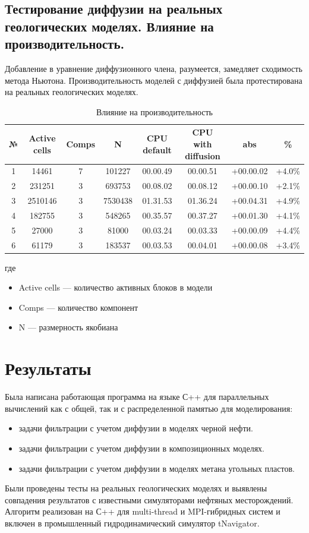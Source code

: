 \documentclass[12pt,a4paper]{article}
\begin{document}
{\subsection {Тестирование диффузии на реальных геологических моделях. Влияние на производительность.}
Добавление в уравнение диффузионного члена, разумеется, замедляет сходимость метода Ньютона. Производительность моделей с диффузией была протестирована на реальных геологических моделях.

\begin{table}[!h]
\caption{Влияние на производительность}
\begin{center}
\begin{tabular}{|c|c|c|c|c|c|c|c|}
\hline
№ & Active cells & Comps & N & CPU default & CPU with diffusion & abs & \% \\
\hline
1 & 14461 & 7 & 101227 & 00.00.49 & 00.00.51 & +00.00.02 & +4.0\% \\
\hline
2 & 231251 & 3 & 693753 & 00.08.02 & 00.08.12 & +00.00.10 & +2.1\% \\
\hline
3 & 2510146 & 3 & 7530438 & 01.31.53 & 01.36.24 & +00.04.31 & +4.9\% \\
\hline
4 & 182755 & 3 & 548265 & 00.35.57 & 00.37.27 & +00.01.30 & +4.1\% \\
\hline
5 & 27000 & 3 & 81000 & 00.03.24 & 00.03.33 & +00.00.09 & +4.4\% \\
\hline
6 & 61179 & 3 & 183537 & 00.03.53 & 00.04.01 & +00.00.08 & +3.4\% \\
\hline
\end{tabular}
\end{center}
\end{table}
где
\begin{itemize}
\item Active cells --- количество активных блоков в модели
\item Comps --- количество компонент
\item N --- размерность якобиана
\end{itemize}

\section{Результаты}
Была написана работающая программа на языке С++ для параллельных вычислений как с общей, так и с распределенной памятью для моделирования:
\begin{itemize}
\item задачи фильтрации с учетом диффузии в моделях черной нефти. 
\item задачи фильтрации с учетом диффузии в композиционных моделях.
\item задачи фильтрации с учетом диффузии в моделях метана угольных пластов.
\end{itemize}
Были проведены тесты на реальных геологических моделях и выявлены совпадения результатов с известными симуляторами нефтяных месторождений. Алгоритм реализован на С++ для multi-thread и MPI-гибридных систем и включен в промышленный гидродинамический симулятор tNavigator.


}
\end{document}
